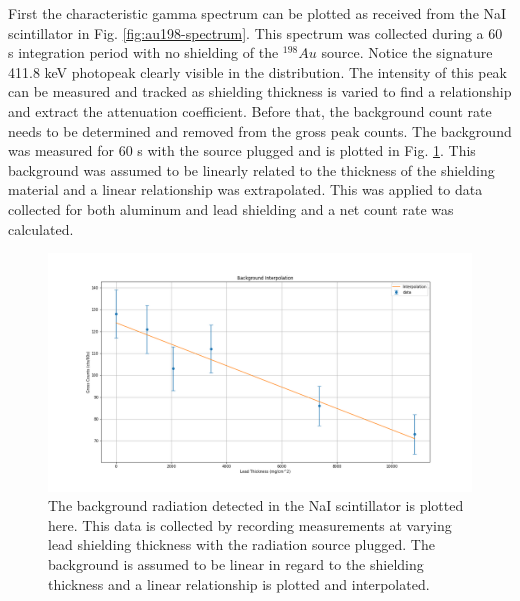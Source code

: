 First the characteristic gamma spectrum can be plotted as received from the NaI scintillator in Fig. \ref{fig:au198-spectrum}. This spectrum was collected during a 60 s integration period with no shielding of the ${}^{198}Au$ source. Notice the signature 411.8 keV photopeak clearly visible in the distribution. The intensity of this peak can be measured and tracked as shielding thickness is varied to find a relationship and extract the attenuation coefficient. Before that, the background count rate needs to be determined and removed from the gross peak counts. The background was measured for 60 s with the source plugged and is plotted in Fig. \ref{fig:background}. This background was assumed to be linearly related to the thickness of the shielding material and a linear relationship was extrapolated. This was applied to data collected for both aluminum and lead shielding and a net count rate was calculated.

\begin{figure}
\centering
\includegraphics[width=\textwidth]{background.png}
\caption{The background radiation detected in the NaI scintillator is plotted here. This data is collected by recording measurements at varying lead shielding thickness with the radiation source plugged. The background is assumed to be linear in regard to the shielding thickness and a linear relationship is plotted and interpolated.}
\label{fig:background}
\end{figure}

